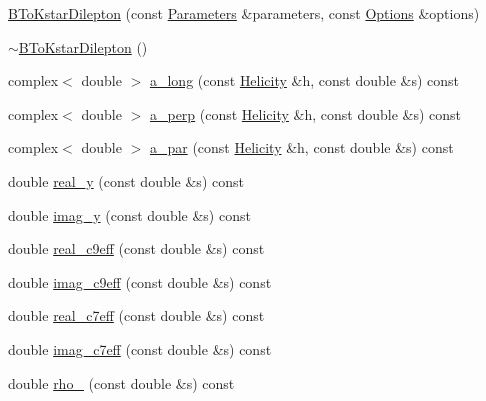 \begin{DoxyCompactItemize}
\item 
\hyperlink{classeos_1_1BToKstarDilepton_3_01LowRecoil_01_4_aa4200bfda741e989e9fe17da1b066e95}{BToKstarDilepton} (const \hyperlink{classeos_1_1Parameters}{Parameters} \&parameters, const \hyperlink{classeos_1_1Options}{Options} \&options)
\item 
\hyperlink{classeos_1_1BToKstarDilepton_3_01LowRecoil_01_4_af83131c6414fa15740d0779b990457b6}{$\sim$BToKstarDilepton} ()
\item 
complex$<$ double $>$ \hyperlink{classeos_1_1BToKstarDilepton_3_01LowRecoil_01_4_abd2799a92ea23c32a4c95b9331bb0937}{a\_\-long} (const \hyperlink{namespaceeos_a4b2f8b0a4184d635cfc47c4ee234aea5}{Helicity} \&h, const double \&s) const 
\item 
complex$<$ double $>$ \hyperlink{classeos_1_1BToKstarDilepton_3_01LowRecoil_01_4_a8f13a8f5eb417374e49b46f9897a7582}{a\_\-perp} (const \hyperlink{namespaceeos_a4b2f8b0a4184d635cfc47c4ee234aea5}{Helicity} \&h, const double \&s) const 
\item 
complex$<$ double $>$ \hyperlink{classeos_1_1BToKstarDilepton_3_01LowRecoil_01_4_a17fa27f2d53760333e9b128d650e7cc7}{a\_\-par} (const \hyperlink{namespaceeos_a4b2f8b0a4184d635cfc47c4ee234aea5}{Helicity} \&h, const double \&s) const 
\item 
double \hyperlink{classeos_1_1BToKstarDilepton_3_01LowRecoil_01_4_a6885b78b5b1c62716b75254ef737ec8a}{real\_\-y} (const double \&s) const 
\item 
double \hyperlink{classeos_1_1BToKstarDilepton_3_01LowRecoil_01_4_ac0f2b68ee038536db3908a042b7b11cc}{imag\_\-y} (const double \&s) const 
\item 
double \hyperlink{classeos_1_1BToKstarDilepton_3_01LowRecoil_01_4_aae2ba6e93e5057d7e756e229c94d8105}{real\_\-c9eff} (const double \&s) const 
\item 
double \hyperlink{classeos_1_1BToKstarDilepton_3_01LowRecoil_01_4_af322796e86288e0b0425fc2dbae20f8d}{imag\_\-c9eff} (const double \&s) const 
\item 
double \hyperlink{classeos_1_1BToKstarDilepton_3_01LowRecoil_01_4_a9909de62ee96092214b2dff401bc8340}{real\_\-c7eff} (const double \&s) const 
\item 
double \hyperlink{classeos_1_1BToKstarDilepton_3_01LowRecoil_01_4_a40fabc015bec286925c5d83a06ac35b5}{imag\_\-c7eff} (const double \&s) const 
\item 
double \hyperlink{classeos_1_1BToKstarDilepton_3_01LowRecoil_01_4_a94a9b9aac31a8e291f69b106cdc466ed}{rho\_} (const double \&s) const 

\end{DoxyCompactItemize}
